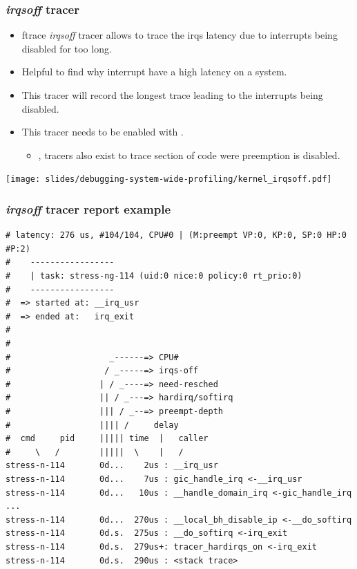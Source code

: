 \begin{frame}
  \frametitle{{\em irqsoff} tracer}
  \begin{itemize}
    \item ftrace {\em irqsoff} tracer allows to trace the irqs latency due to 
          interrupts being disabled for too long.
    \item Helpful to find why interrupt have a high latency on a system.
    \item This tracer will record the longest trace leading to the interrupts
          being disabled.
    \item This tracer needs to be enabled with .
    \begin{itemize}
      \item {},  tracers also exist to trace
            section of code were preemption is disabled.
    \end{itemize}
  \end{itemize}
  \center\texttt{[image: slides/debugging-system-wide-profiling/kernel\_irqsoff.pdf]}
\end{frame}

\begin{frame}[fragile]
  \frametitle{{\em irqsoff} tracer report example}
  \begin{block}{}
    \begin{verbatim}
# latency: 276 us, #104/104, CPU#0 | (M:preempt VP:0, KP:0, SP:0 HP:0 #P:2)
#    -----------------
#    | task: stress-ng-114 (uid:0 nice:0 policy:0 rt_prio:0)
#    -----------------
#  => started at: __irq_usr
#  => ended at:   irq_exit
#
#
#                    _------=> CPU#            
#                   / _-----=> irqs-off        
#                  | / _----=> need-resched    
#                  || / _---=> hardirq/softirq 
#                  ||| / _--=> preempt-depth   
#                  |||| /     delay            
#  cmd     pid     ||||| time  |   caller      
#     \   /        |||||  \    |   /         
stress-n-114       0d...    2us : __irq_usr
stress-n-114       0d...    7us : gic_handle_irq <-__irq_usr
stress-n-114       0d...   10us : __handle_domain_irq <-gic_handle_irq
...
stress-n-114       0d...  270us : __local_bh_disable_ip <-__do_softirq
stress-n-114       0d.s.  275us : __do_softirq <-irq_exit
stress-n-114       0d.s.  279us+: tracer_hardirqs_on <-irq_exit
stress-n-114       0d.s.  290us : <stack trace>
    \end{verbatim}
  \end{block}
\end{frame}

